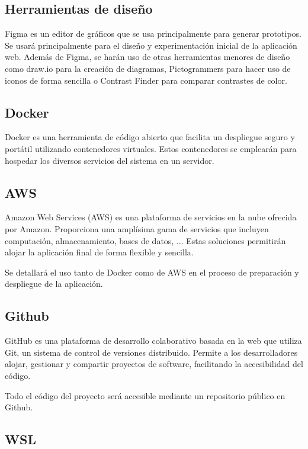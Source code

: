 \subsection{Herramientas de diseño}

Figma \cite{figma} es un editor de gráficos que se usa principalmente para generar prototipos. Se usará principalmente para
el diseño y experimentación inicial de la aplicación web. Además de Figma, se harán uso de otras herramientas
menores de diseño como draw.io \cite{draw.io} para la creación de diagramas, Pictogrammers \cite{pictogrammers} para hacer uso de
iconos de forma sencilla o Contrast Finder \cite{contrastFinder} para comparar contrastes de color.

\subsection{Docker}

Docker \cite{docker} es una herramienta de código abierto que facilita un despliegue seguro y portátil utilizando contenedores
virtuales. Estos contenedores se emplearán para hospedar los diversos servicios del sistema en un
servidor.

\subsection{AWS}

Amazon \cite{aws} Web Services (AWS) es una plataforma de servicios en la nube ofrecida por Amazon. Proporciona
una amplísima gama de servicios que incluyen computación, almacenamiento, bases de datos, ... Estas soluciones permitirán
alojar la aplicación final de forma flexible y sencilla.

Se detallará el uso tanto de Docker como de AWS en el proceso de preparación y despliegue de la aplicación.

\subsection{Github}

GitHub \cite{github} es una plataforma de desarrollo colaborativo basada en la web que utiliza Git, un sistema de control de versiones
distribuido. Permite a los desarrolladores alojar, gestionar y compartir proyectos de software, facilitando la accesibilidad
del código.

Todo el código del proyecto será accesible mediante un repositorio público en Github.

\subsection{WSL}

